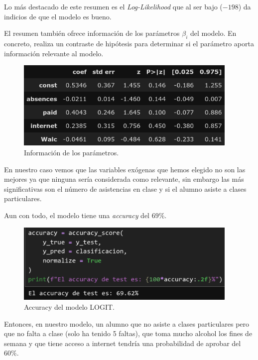 Lo más destacado de este resumen es el \textit{Log-Likelihood} que al ser bajo ($-198$) da indicios de que el modelo es bueno.

El resumen también ofrece información de los parámetros $\beta_{i}$ del modelo. En concreto, realiza un contraste de hipótesis para determinar si el parámetro aporta información relevante al modelo.

\begin{figure}[H]
    \begin{center}
        \includegraphics[width=0.95\textwidth]{figures/parameters.png}
    \end{center}
    \caption{Información de los parámetros.}\label{fig:}
\end{figure}

En nuestro caso vemos que las variables exógenas que hemos elegido no son las mejores ya que ninguna sería considerada como relevante, sin embargo las más significativas son el número de asistencias en clase y si el alumno asiste a clases particulares.

Aun con todo, el modelo tiene una \textit{accuracy} del $69\%$.

\begin{figure}[H]
    \begin{center}
        \includegraphics[width=0.95\textwidth]{figures/accuracy.png}
    \end{center}
    \caption{Accuracy del modelo LOGIT.}\label{fig:accuracy}
\end{figure}

Entonces, en nuestro modelo, un alumno que no asiste a clases particulares pero que no falta a clase (solo ha tenido 5 faltas), que toma mucho alcohol los fines de semana y que tiene acceso a internet tendría una probabilidad de aprobar del $60\%$.

